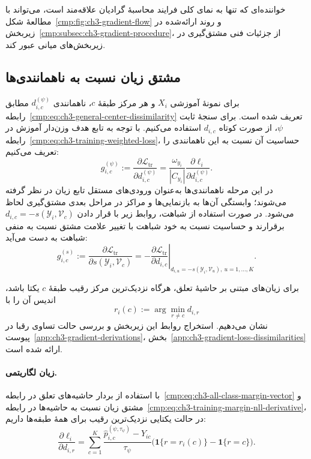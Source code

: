خواننده‌ای که تنها به نمای کلی فرایند محاسبهٔ
گرادیان علاقه‌مند است، می‌تواند با مطالعهٔ
شکل~\ref{cmp:fig:ch3-gradient-flow} و روند
ارائه‌شده در زیربخش~\ref{cmp:subsec:ch3-gradient-procedure}،
از جزئیات فنی مشتق‌گیری در زیربخش‌های میانی
عبور کند.

\subsection{مشتق زیان نسبت به ناهمانندی‌ها}
\label{cmp:subsec:ch3-gradient-loss-dissimilarities}

برای نمونهٔ آموزشی $X_i$ و هر مرکز طبقهٔ $c$،
ناهمانندی $d_{i,c}^{(\psi)}$ مطابق
رابطه~\eqref{cmp:eq:ch3-general-center-dissimilarity}
تعریف شده است. برای سنجهٔ ثابت $\psi$، از صورت
کوتاه $d_{i,c}$ استفاده می‌کنیم. با توجه به
تابع هدف وزن‌دار آموزش در
رابطه~\eqref{cmp:eq:ch3-training-weighted-loss}،
حساسیت آن نسبت به این ناهمانندی را تعریف می‌کنیم:
\begin{equation}\label{cmp:eq:ch3-gradient-loss-distance-coefficient}
\boxed{
g_{i,c}^{(\psi)}
:=\frac{\partial\mathcal L_{\mathrm{tr}}}
{\partial d_{i,c}^{(\psi)}}
=\frac{\omega_{y_i}}{|C_{y_i}|}
\frac{\partial\ell_i}{\partial d_{i,c}^{(\psi)}}.
}
\end{equation}
در این مرحله ناهمانندی‌ها به‌عنوان ورودی‌های
مستقل تابع زیان در نظر گرفته می‌شوند؛ وابستگی
آن‌ها به بازنمایی‌ها و مراکز در مراحل بعدی
مشتق‌گیری لحاظ می‌شود. در صورت استفاده از شباهت،
روابط زیر با قرار دادن $d_{i,c}=-s(\mathscr Y_i,\mathcal V_c)$
برقرارند و حساسیت نسبت به خود شباهت با تغییر علامت
مشتق نسبت به منفی شباهت به دست می‌آید:
\begin{equation}\label{cmp:eq:ch3-gradient-loss-similarity-coefficient}
g_{i,c}^{(s)}
:=\frac{\partial\mathcal L_{\mathrm{tr}}}
{\partial s(\mathscr Y_i,\mathcal V_c)}
=-\left.
\frac{\partial\mathcal L_{\mathrm{tr}}}{\partial d_{i,c}}
\right|_{d_{i,u}=-s(\mathscr Y_i,\mathcal V_u),\ u=1,\ldots,K}.
\end{equation}

برای زیان‌های مبتنی بر حاشیهٔ تعلق، هرگاه
نزدیک‌ترین مرکز رقیب طبقهٔ $c$ یکتا باشد، اندیس
آن را با
\begin{equation}\label{cmp:eq:ch3-gradient-nearest-rival}
r_i(c):=\arg\min_{r\ne c}d_{i,r}
\end{equation}
نشان می‌دهیم. استخراج روابط این زیربخش و
بررسی حالت تساوی رقبا در
پیوست~\ref{app:ch3-gradient-derivations}،
بخش~\ref{app:ch3-gradient-loss-dissimilarities}
ارائه شده است.

\paragraph{زیان لگاریتمی.}
با استفاده از بردار حاشیه‌های تعلق در
رابطه~\eqref{cmp:eq:ch3-all-class-margin-vector}
و مشتق زیان نسبت به حاشیه‌ها در
رابطه~\eqref{cmp:eq:ch3-training-margin-nll-derivative}،
در حالت یکتایی نزدیک‌ترین رقیب برای همهٔ طبقه‌ها داریم:
\begin{equation}\label{cmp:eq:ch3-gradient-nll-distance}
\boxed{
\frac{\partial\ell_i}{\partial d_{i,r}}
=\sum_{c=1}^{K}
\frac{\widehat p_{i,c}^{(\psi,\tau_\psi)}-Y_{ic}}{\tau_\psi}
\bigl(\mathbf1\{r=r_i(c)\}-\mathbf1\{r=c\}\bigr).
}
\end{equation}

